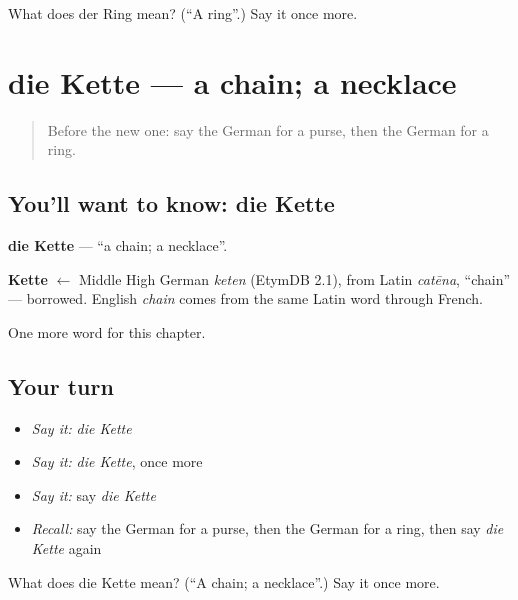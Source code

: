 \begin{tcolorbox}[breakable,colback=teal!4,colframe=teal!35!black,title={Before you move on}]
What does der Ring mean? (\textquotedblleft{}A ring\textquotedblright{}.) Say it once more.
\end{tcolorbox}
\section[die Kette]{die Kette — a chain; a necklace}

\label{lesson:GE-C117-kette}



\begin{quote}
Before the new one: say the German for a purse, then the German for a ring.
\end{quote}

\subsection*{You'll want to know: die Kette}
\textbf{die Kette} — \textquotedblleft{}a chain; a necklace\textquotedblright{}.

\begin{cousinweb}
\textbf{Kette} $\leftarrow$ Middle High German \emph{keten} (EtymDB 2.1), from Latin \emph{catēna}, \textquotedblleft{}chain\textquotedblright{} — borrowed. English \emph{chain} comes from the same Latin word through French.
\end{cousinweb}

\begin{grammarlens}[title={What you've built}]
One more word for this chapter.
\end{grammarlens}

\subsection*{Your turn}
\begin{itemize}
\raggedright
  \item \emph{Say it:} \emph{die Kette}
  \item \emph{Say it:} \emph{die Kette}, once more
  \item \emph{Say it:} say \emph{die Kette}
  \item \emph{Recall:} say the German for a purse, then the German for a ring, then say \emph{die Kette} again
\end{itemize}

\begin{tcolorbox}[breakable,colback=teal!4,colframe=teal!35!black,title={Before you move on}]
What does die Kette mean? (\textquotedblleft{}A chain; a necklace\textquotedblright{}.) Say it once more.
\end{tcolorbox}
